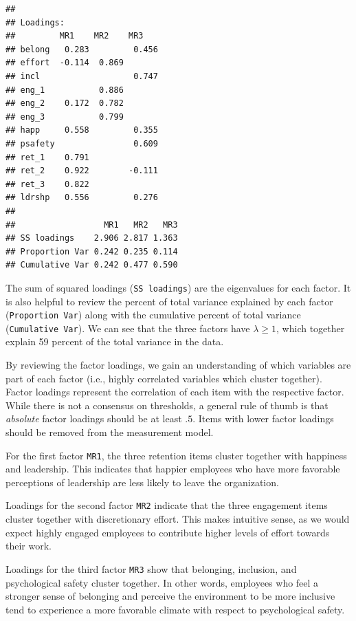 \documentclass[
]{book}
\begin{document}
\begin{verbatim}
## 
## Loadings:
##         MR1    MR2    MR3   
## belong   0.283         0.456
## effort  -0.114  0.869       
## incl                   0.747
## eng_1           0.886       
## eng_2    0.172  0.782       
## eng_3           0.799       
## happ     0.558         0.355
## psafety                0.609
## ret_1    0.791              
## ret_2    0.922        -0.111
## ret_3    0.822              
## ldrshp   0.556         0.276
## 
##                  MR1   MR2   MR3
## SS loadings    2.906 2.817 1.363
## Proportion Var 0.242 0.235 0.114
## Cumulative Var 0.242 0.477 0.590
\end{verbatim}

The sum of squared loadings (\texttt{SS\ loadings}) are the eigenvalues for each factor. It is also helpful to review the percent of total variance explained by each factor (\texttt{Proportion\ Var}) along with the cumulative percent of total variance (\texttt{Cumulative\ Var}). We can see that the three factors have \(\lambda \ge 1\), which together explain 59 percent of the total variance in the data.

By reviewing the factor loadings, we gain an understanding of which variables are part of each factor (i.e., highly correlated variables which cluster together). Factor loadings represent the correlation of each item with the respective factor. While there is not a consensus on thresholds, a general rule of thumb is that \emph{absolute} factor loadings should be at least \(.5\). Items with lower factor loadings should be removed from the measurement model.

For the first factor \texttt{MR1}, the three retention items cluster together with happiness and leadership. This indicates that happier employees who have more favorable perceptions of leadership are less likely to leave the organization.

Loadings for the second factor \texttt{MR2} indicate that the three engagement items cluster together with discretionary effort. This makes intuitive sense, as we would expect highly engaged employees to contribute higher levels of effort towards their work.

Loadings for the third factor \texttt{MR3} show that belonging, inclusion, and psychological safety cluster together. In other words, employees who feel a stronger sense of belonging and perceive the environment to be more inclusive tend to experience a more favorable climate with respect to psychological safety.
\end{document}
